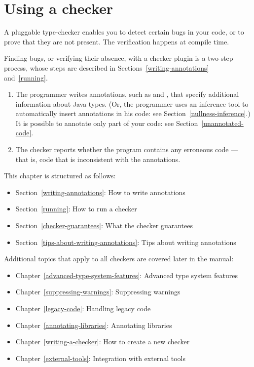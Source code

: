 \htmlhr
\chapter{Using a checker\label{using-a-checker}}

A pluggable type-checker enables you to detect certain bugs in your code,
or to prove that they are not present.  The verification happens at compile
time.


Finding bugs, or verifying their absence, with a checker plugin is a two-step process, whose steps are
described in Sections~\ref{writing-annotations} and~\ref{running}.

\begin{enumerate}

\item The programmer writes annotations, such as  and
  , that specify additional information about Java types.
  (Or, the programmer uses an inference tool to automatically insert
  annotations in his code:  see Section~\ref{nullness-inference}.)
  It is possible to annotate only part of your code:  see
  Section~\ref{unannotated-code}.

\item The checker reports whether the program contains any erroneous code
  --- that is, code that is inconsistent with the annotations.

\end{enumerate}

This chapter is structured as follows:
\begin{itemize}
\item Section~\ref{writing-annotations}: How to write annotations
\item Section~\ref{running}:  How to run a checker
\item Section~\ref{checker-guarantees}: What the checker guarantees
\item Section~\ref{tips-about-writing-annotations}: Tips about writing annotations
\end{itemize}

Additional topics that apply to all checkers are covered later in the manual:
\begin{itemize}
\item Chapter~\ref{advanced-type-system-features}: Advanced type system features
\item Chapter~\ref{suppressing-warnings}: Suppressing warnings
\item Chapter~\ref{legacy-code}: Handling legacy code
\item Chapter~\ref{annotating-libraries}: Annotating libraries
\item Chapter~\ref{writing-a-checker}: How to create a new checker
\item Chapter~\ref{external-tools}: Integration with external tools
\end{itemize}


